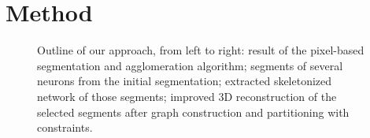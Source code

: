 \section{Method}

\begin{figure}[htbp]
	\begin{center}
	\end{center}
	\caption{Outline of our approach, from left to right: result of the pixel-based segmentation and agglomeration algorithm; segments of several neurons from the initial segmentation; extracted skeletonized network of those segments; improved 3D reconstruction of the selected segments after graph construction and partitioning with constraints.}
	\label{fig:overview}
\end{figure}

